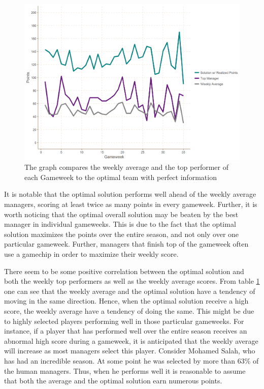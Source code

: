 \begin{figure}[H]
\label{fig:Comparison}
    \centering
    \includegraphics[scale=0.75]{fig/chapter_7/perf_top_avg.png}
    \caption{The graph compares the weekly average and the top performer of each Gameweek to the optimal team with perfect information}
\label{Figure_Comparison}    
\end{figure}

 
It is notable that the optimal solution performs well ahead of the weekly average managers, scoring at least twice as many points in every gameweek. Further, it is worth noticing that the optimal overall solution may be beaten by the best manager in individual gameweeks. This is due to the fact that the optimal solution maximizes the points over the entire season, and not only over one particular gameweek. Further, managers that finish top of the gameweek often use a gamechip in order to maximize their weekly score. 

\newpar

There seem to be some positive correlation between the optimal solution and both the weekly top performers as well as the weekly average scores. From table \ref{Figure_Comparison} one can see that the weekly average and the optimal solution have a tendency of moving in the same direction. Hence, when the optimal solution receive a high score, the weekly average have a tendency of doing the same. This might be due to highly selected players performing well in those particular gameweeks. For instance, if a player that has performed well over the entire season receives an abnormal high score during a gameweek, it is anticipated that the weekly average will increase as most managers select this player. Consider Mohamed Salah, who has had an incredible season. At some point he was selected by more than 63\% of the human managers. Thus, when he performs well it is reasonable to assume that both the average and the optimal solution earn numerous points.

